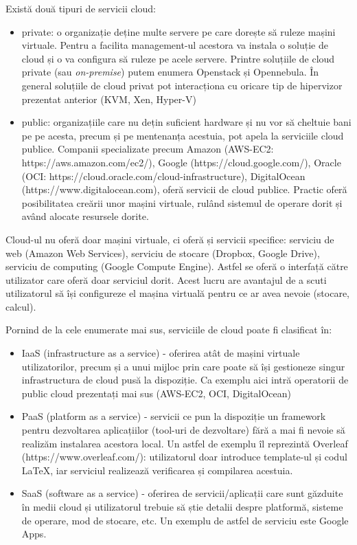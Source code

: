Există două tipuri de servicii cloud:

\begin{itemize}
	\item private: o organizație deține multe servere pe care dorește să
		ruleze mașini virtuale. Pentru a facilita management-ul acestora
		va instala o soluție de cloud și o va configura să ruleze pe
		acele servere. Printre soluțiile de cloud private (sau
		\textit{on-premise}) putem enumera Openstack și Opennebula. În
		general soluțiile de cloud privat pot interacționa cu oricare
		tip de hipervizor prezentat anterior (KVM, Xen, Hyper-V)
	\item public: organizațiile care nu dețin suficient hardware și nu vor
		să cheltuie bani pe pe acesta, precum și pe mentenanța acestuia,
		pot apela la serviciile cloud publice. Companii specializate
		precum Amazon (AWS-EC2: https://aws.amazon.com/ec2/), Google
		(https://cloud.google.com/), Oracle (OCI:
		https://cloud.oracle.com/cloud-infrastructure), DigitalOcean
		(https://www.digitalocean.com), oferă servicii de cloud publice.
		Practic oferă posibilitatea creării unor mașini virtuale, rulând
		sistemul de operare dorit și având alocate resursele dorite.
\end{itemize}

Cloud-ul nu oferă doar mașini virtuale, ci oferă și servicii specifice: serviciu
de web (Amazon Web Services), serviciu de stocare (Dropbox, Google Drive),
serviciu de computing (Google Compute Engine). Astfel se oferă o interfață
către utilizator care oferă doar serviciul dorit. Acest lucru are avantajul de a
scuti utilizatorul să își configureze el mașina virtuală pentru ce ar avea
nevoie (stocare, calcul).

Pornind de la cele enumerate mai sus, serviciile de cloud poate fi clasificat în:

\begin{itemize}
	\item IaaS (infrastructure as a service) - oferirea atât de mașini
		virtuale utilizatorilor, precum și a unui mijloc prin care poate
		să își gestioneze singur infrastructura de cloud pusă la
		dispoziție. Ca exemplu aici intră operatorii de public cloud
		prezentați mai sus (AWS-EC2, OCI, DigitalOcean)
	\item PaaS (platform as a service) - servicii ce pun la dispoziție un
		framework pentru dezvoltarea aplicațiilor (tool-uri de
		dezvoltare) fără a mai fi nevoie să realizăm instalarea acestora
		local. Un astfel de exemplu îl reprezintă Overleaf
		(https://www.overleaf.com/): utilizatorul doar introduce
		template-ul și codul LaTeX, iar serviciul realizează verificarea
		și compilarea acestuia.
	\item SaaS (software as a service) - oferirea de servicii/aplicații care
		sunt găzduite în medii cloud și utilizatorul trebuie să știe
		detalii despre platformă, sisteme de operare, mod de stocare,
		etc. Un exemplu de astfel de serviciu este Google Apps.
\end{itemize}


